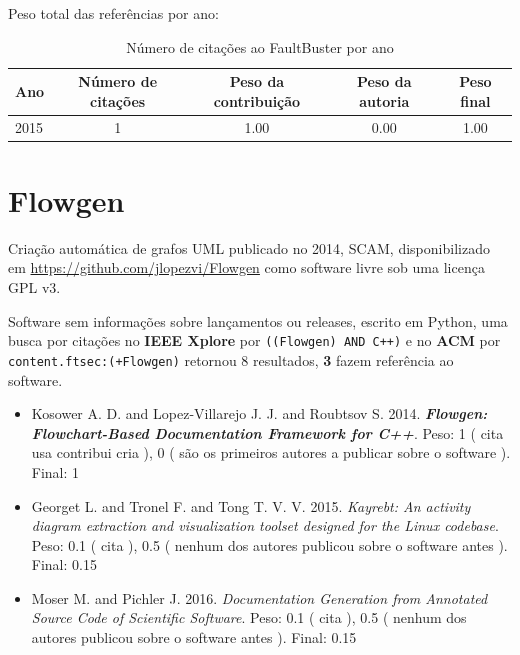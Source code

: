 Peso total das referências por ano:

\begin{table}[h]
\caption{Número de citações ao FaultBuster por ano}
\centering
\begin{tabular}{| l | c | c | c | c |}
  \hline
  Ano & Número de citações & Peso da contribuição & Peso da autoria & Peso final \\
  \hline
  2015
    & 1
    & 1.00
    & 0.00
    & 1.00 \\
  \hline
\end{tabular}
\end{table}


\section{Flowgen}

Criação automática de grafos UML
publicado no 2014, SCAM,
disponibilizado em \url{https://github.com/jlopezvi/Flowgen}
como software livre
sob uma licença GPL v3.

Software sem informações sobre lançamentos ou releases,
escrito em Python,
uma busca por citações no {\bf IEEE Xplore} por
\texttt{((Flowgen) AND C++)}
e no {\bf ACM} por
\texttt{content.ftsec:(+Flowgen)}
retornou
8 resultados,
{\bf 3} fazem referência ao software.

\begin{itemize}
\item Kosower A. D. and Lopez-Villarejo J. J. and Roubtsov S.
      2014.
        \textbf{\textit{ Flowgen: Flowchart-Based Documentation Framework for C++}}.
      Peso:
      1 (
          cita
          usa
          contribui
          cria
      ),
      0 (
são os primeiros autores a publicar sobre o software
      ).
      Final:
      1

\item Georget L. and Tronel F. and Tong T. V. V.
      2015.
        \textit{ Kayrebt: An activity diagram extraction and visualization toolset designed for the Linux codebase}.
      Peso:
      0.1 (
          cita
      ),
      0.5 (
nenhum dos autores publicou sobre o software antes
      ).
      Final:
      0.15

\item Moser M. and Pichler J.
      2016.
        \textit{ Documentation Generation from Annotated Source Code of Scientific Software}.
      Peso:
      0.1 (
          cita
      ),
      0.5 (
nenhum dos autores publicou sobre o software antes
      ).
      Final:
      0.15

\end{itemize}

